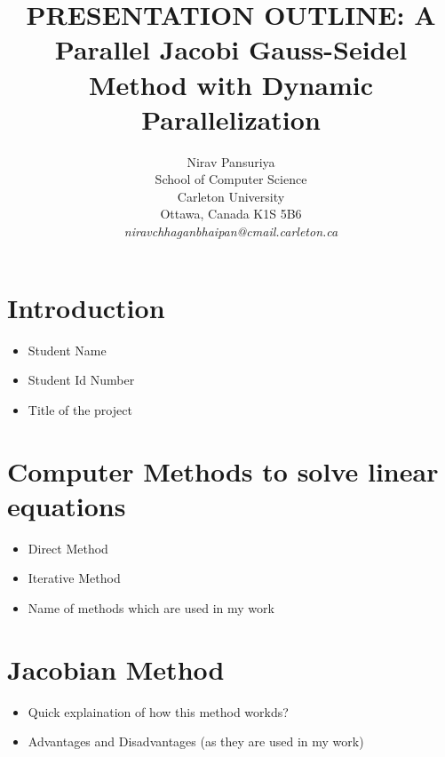 \documentclass[11pt]{article}       %
\newenvironment{slide}[1]        {\section{#1} \begin{itemize}}%
                                 {\end{itemize}}
\begin{document}

\newcommand{\SubItem}[1]{
    {\setlength\itemindent{15pt} \item[-] #1}
}
\title{PRESENTATION OUTLINE: A Parallel Jacobi Gauss-Seidel Method with Dynamic Parallelization}


\author{
Nirav Pansuriya\\
School of Computer Science\\
Carleton University\\
Ottawa, Canada K1S 5B6\\
{\em niravchhaganbhaipan@cmail.carleton.ca}
} %

\maketitle

\begin{slide}{Introduction}
\item Student Name
\item Student Id Number
\item Title of the project
\end{slide}


\begin{slide}{Computer Methods to solve linear equations}
\item Direct Method
\item Iterative Method
\item Name of methods which are used in my work
\end{slide}

\begin{slide}{Jacobian Method}
\item Quick explaination of how this method workds?
\item Advantages and Disadvantages (as they are used in my work)
\end{slide}
\end{document}
